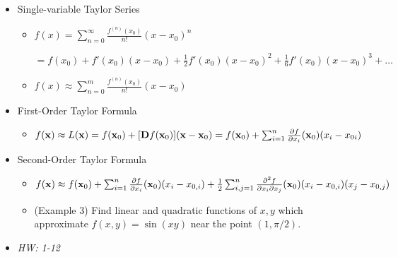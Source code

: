 \documentclass[11pt]{article}
\begin{document}
\begin{itemize}
  \item Single-variable Taylor Series
    \begin{itemize}
      \item
        \(\displaystyle
          f(x)
            =
          \sum_{n=0}^\infty \frac{f^{(n)}(x_0)}{n!}(x-x_0)^n
        \)

        \(\displaystyle
            =
          f(x_0)+f'(x_0)(x-x_0)+\frac{1}{2}f'(x_0)(x-x_0)^2
          +\frac{1}{6}f'(x_0)(x-x_0)^3+\dots
        \)
      \item
        \(\displaystyle
          f(x)
            \approx
          \sum_{n=0}^m \frac{f^{(n)}(x_0)}{n!}(x-x_0)
        \)
    \end{itemize}
  \item First-Order Taylor Formula
    \begin{itemize}
      \item
        \(
          f(\mathbf{x})
            \approx
          L(\mathbf{x})
            =
          f(\mathbf{x}_0) + [\mathbf{D}f(\mathbf{x}_0)](\mathbf{x} - \mathbf{x}_0)
            =
          f(\mathbf{x}_0)
            +
          \sum_{i=1}^{n}\frac{\partial f}{\partial x_i}(\mathbf{x}_0)(x_i - x_{0i})
        \)
    \end{itemize}
  \item Second-Order Taylor Formula
    \begin{itemize}
      \item
        \(
          f(\mathbf{x})
            \approx
          f(\mathbf{x}_0)
            +
          \sum_{i=1}^{n}\frac{\partial f}{\partial x_i}(\mathbf{x}_0)(x_i-x_{0,i})
            +
          \frac{1}{2}
          \sum_{i,j=1}^{n}\frac{\partial^2 f}{\partial x_i\partial x_j}(\mathbf{x}_0)(x_i-x_{0,i})(x_j-x_{0,j})
        \)
      \item
        (Example 3) Find linear and quadratic functions of \(x,y\) which
        approximate \(f(x,y)=\sin(xy)\) near the point \((1,\pi/2)\).
    \end{itemize}
  \item\textit{
    HW: 1-12
  }
\end{itemize}


\end{document}

